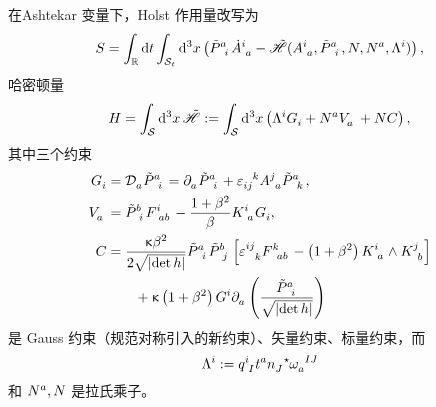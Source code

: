 		\begin{Property}
			在Ashtekar 变量下，Holst 作用量改写为
			\begin{equation}
				S = \int_{\mathbb{R}} \dd{t} \int_{\spc_t} \dd[3]{x} \left( \tensor{\tilde{P}}{^a_i} \tensor{\dot{A}}{^i_a} - \Had(\tensor{A}{^i_a}, \tensor{\tilde{P}}{^a_i}, N, \tensor{N}{^a}, \tensor{\Lambda}{^i}) \right),
			\end{equation}
			哈密顿量
			\begin{equation}
				H = \int_{\spc} \dd[3]{x} \Had := \int_{\spc} \dd[3]{x} \left( \tensor{\Lambda}{^i} \tensor{G}{_i} + \tensor{N}{^a} \tensor{V}{_a} + N C \right),
			\end{equation}
			其中三个约束
			\begin{equation}
				\begin{split}
					\tensor{G}{_i} &= \AD{a} \tensor{\tilde{P}}{^a_i} = \Partial{a} \tensor{\tilde{P}}{^a_i} + \tensor{\vol}{_i_j^k} \tensor{A}{^j_a} \tensor{\tilde{P}}{^a_k},\\
					\tensor{V}{_a} &= \tensor{\tilde{P}}{^b_i} \tensor{F}{^i_a_b} - \frac{1+\beta^2}{\beta} \tensor{K}{^i_a} \tensor{G}{_i},\\
					C &= \frac{\gkappa \beta^2}{2\sqrt{\abs{\det h}}} \tensor{\tilde{P}}{^a_i} \tensor{\tilde{P}}{^b_j} \left[ \tensor{\vol}{^i^j_k} \tensor{F}{^k_a_b} - \left( 1+ \beta^2 \right) \tensor{K}{^i_a} \wedge \tensor{K}{^j_b} \right]\\
					& \qquad + \gkappa \left( 1 +\beta^2 \right) \tensor{G}{^i} \Partial{a} \left( \frac{\tensor{\tilde{P}}{^a_i}}{\sqrt{\abs{\det h}}} \right)\label{eq-constrains_in_Ashtekar_connection}
				\end{split}
			\end{equation}
			是 Gauss 约束（规范对称引入的新约束）、矢量约束、标量约束，而
			\begin{equation}
				\tensor{\Lambda}{^i} := \tensor{q}{^i_I} \tensor{t}{^a} \tensor{n}{_J} \tensor[^\star]{\omega}{_a^I^J}
			\end{equation}
			和 $\tensor{N}{^a},N$ 是拉氏乘子。
		\end{Property}

